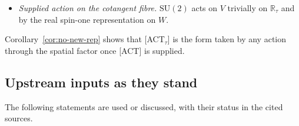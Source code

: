 \documentclass[12pt,a4paper]{article}
\newcommand{\SU}{\mathrm{SU}}
\newcommand{\Rtau}{\mathbb{R}_\tau}
\begin{document}
      \begin{itemize}
        \item[\textup{[ACT$_\tau$]}] \emph{Supplied action on the cotangent fibre.}
        $\SU(2)$ acts on $V$ trivially on $\Rtau$ and by the real spin-one representation on $W$.
      \end{itemize}

      Corollary~\ref{cor:no-new-rep} shows that [ACT$_\tau$] is the form taken by any action through the spatial
      factor once [ACT] is supplied.

    \subsection{Upstream inputs as they stand}

      The following statements are used or discussed, with their status in the cited sources.
\end{document}
